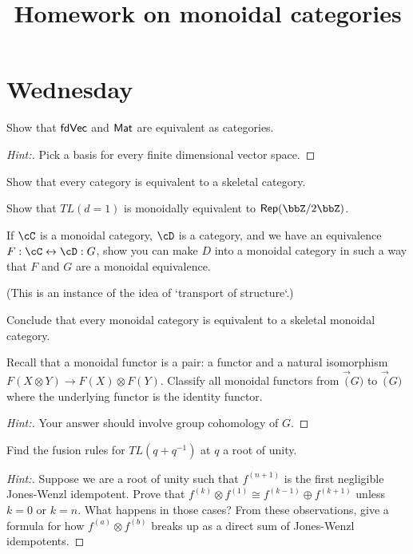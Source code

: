 \documentclass[11pt]{article}
\begin{document}
\title{Homework on monoidal categories}
\maketitle

\section{Wednesday}

\begin{exercise} 
Show that $\mathsf{fdVec}$ and $\mathsf{Mat}$ are equivalent as categories.
\end{exercise}
\begin{proof}[Hint:]
Pick a basis for every finite dimensional vector space.
\end{proof}

\begin{exercise}
Show that every category is equivalent to a skeletal category.
\end{exercise}

\begin{exercise}
Show that $TL(d=1)$ is monoidally equivalent to $\Rep(\bbZ / 2 \bbZ)$.
\end{exercise}

\begin{exercise}
If $\cC$ is a monoidal category, $\cD$ is a category, and we have an equivalence $F:\cC \leftrightarrow \cD:G$, show you can make $D$ into a  monoidal category in such a way that $F$ and $G$ are a monoidal equivalence.
\end{exercise}
(This is an instance of the idea of `transport of structure`.)

\begin{exercise}
Conclude that every monoidal category is equivalent to a skeletal monoidal category. 
\end{exercise}

\begin{exercise}
Recall that a monoidal functor is a pair: a functor and a natural isomorphism $F(X \otimes Y) \to F(X) \otimes F(Y)$.  Classify all monoidal functors from $\Vec(G)$ to $\Vec(G)$ where the underlying functor is the identity functor. 
\end{exercise}
\begin{proof}[Hint:]
Your answer should involve group cohomology of $G$.
\end{proof}

\begin{exercise}
\label{ex:TL-fusion}
Find the fusion rules for $TL(q+q^{-1})$ at $q$ a root of unity.
\end{exercise}
\begin{proof}[Hint:]
Suppose we are a root of unity such that $f^{(n+1)}$ is the first negligible Jones-Wenzl idempotent. Prove that $f^{(k)} \otimes f^{(1)} \cong f^{(k-1)} \oplus f^{(k+1)}$ unless $k=0$ or $k=n$. What happens in those cases? From these observations, give a formula for how $f^{(a)} \otimes f^{(b)}$ breaks up as a direct sum of Jones-Wenzl idempotents.
\end{proof}
\end{document}
